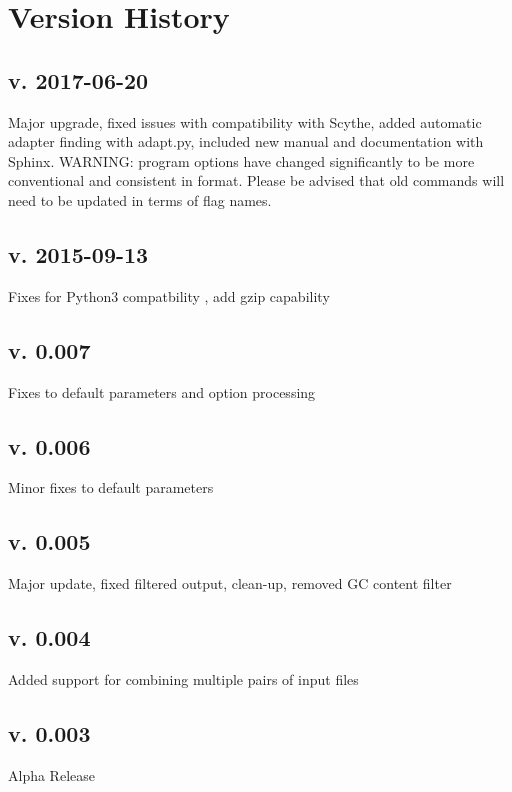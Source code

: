 \documentclass[letterpaper,10pt,english]{sphinxmanual}
\begin{document}
\section{Version History}
\label{\detokenize{intro:version-history}}

\subsection{v. 2017-06-20}
\label{\detokenize{intro:v-2017-06-20}}
Major upgrade, fixed issues with compatibility with Scythe,
added automatic adapter finding with adapt.py,
included new manual and documentation with Sphinx.
WARNING: program options have changed significantly to
be more conventional and consistent in format. Please be
advised that old commands will need to be updated in terms
of flag names.


\subsection{v. 2015-09-13}
\label{\detokenize{intro:v-2015-09-13}}
Fixes for Python3 compatbility , add gzip capability


\subsection{v. 0.007}
\label{\detokenize{intro:v-0-007}}
Fixes to default parameters and option processing


\subsection{v. 0.006}
\label{\detokenize{intro:v-0-006}}
Minor fixes to default parameters


\subsection{v. 0.005}
\label{\detokenize{intro:v-0-005}}
Major update, fixed filtered output, clean-up, removed GC content filter


\subsection{v. 0.004}
\label{\detokenize{intro:v-0-004}}
Added support for combining multiple pairs of input files


\subsection{v. 0.003}
\label{\detokenize{intro:v-0-003}}
Alpha Release
\end{document}
